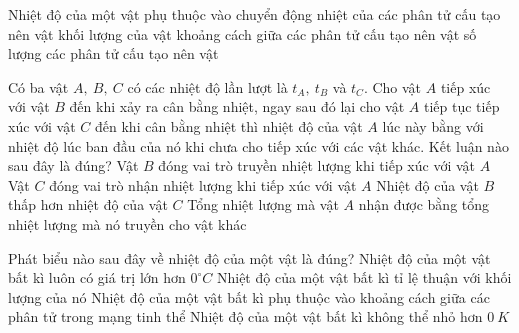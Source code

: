 \begin{ex} 
	Nhiệt độ của một vật phụ thuộc vào
	\choice
	{\True chuyển động nhiệt của các phân tử cấu tạo nên vật}
	{khối lượng của vật}
	{khoảng cách giữa các phân tử cấu tạo nên vật}
	{số lượng các phân tử cấu tạo nên vật}
\end{ex}

\begin{ex} 
	Có ba vật $A,\ B,\ C$ có các nhiệt độ lần lượt là $t_{A},\ t_{B}$ và $t_C$. Cho vật $A$ tiếp xúc với vật $B$ đến khi xảy ra cân bằng nhiệt, ngay sau đó lại cho vật $A$ tiếp tục tiếp xúc với vật $C$ đến khi cân bằng nhiệt thì nhiệt độ của vật $A$ lúc này bằng với nhiệt độ lúc ban đầu của nó khi chưa cho tiếp xúc với các vật khác. Kết luận nào sau đây là đúng?
	\choice
	{Vật $B$ đóng vai trò truyền nhiệt lượng khi tiếp xúc với vật $A$}
	{Vật $C$ đóng vai trò nhận nhiệt lượng khi tiếp xúc với vật $A$}
	{Nhiệt độ của vật $B$ thấp hơn nhiệt độ của vật $C$}
	{\True Tổng nhiệt lượng mà vật $A$ nhận được bằng tổng nhiệt lượng mà nó truyền cho vật khác}
\end{ex}

\begin{ex} 
	Phát biểu nào sau đây về nhiệt độ của một vật là đúng?
	\choice
	{Nhiệt độ của một vật bất kì luôn có giá trị lớn hơn $0^\circ C$}
	{Nhiệt độ của một vật bất kì tỉ lệ thuận với khối lượng của nó}
	{Nhiệt độ của một vật bất kì phụ thuộc vào khoảng cách giữa các phân tử trong mạng tinh thể}
	{\True Nhiệt độ của một vật bất kì không thể nhỏ hơn $0\ K$}
\end{ex}

